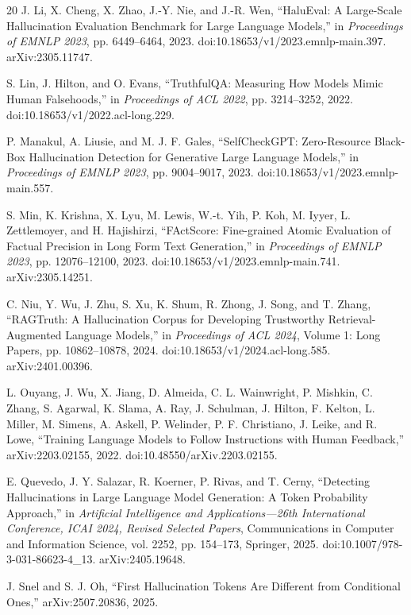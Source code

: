 \documentclass[11pt]{article}
\begin{document}
\begin{thebibliography}{20}
J. Li, X. Cheng, X. Zhao, J.-Y. Nie, and J.-R. Wen,
``HaluEval: A Large-Scale Hallucination Evaluation Benchmark for Large Language Models,''
in \textit{Proceedings of EMNLP 2023},
pp. 6449--6464, 2023.
doi:10.18653/v1/2023.emnlp-main.397.
arXiv:2305.11747.

S. Lin, J. Hilton, and O. Evans,
``TruthfulQA: Measuring How Models Mimic Human Falsehoods,''
in \textit{Proceedings of ACL 2022},
pp. 3214--3252, 2022.
doi:10.18653/v1/2022.acl-long.229.

P. Manakul, A. Liusie, and M. J. F. Gales,
``SelfCheckGPT: Zero-Resource Black-Box Hallucination Detection for Generative Large Language Models,''
in \textit{Proceedings of EMNLP 2023},
pp. 9004--9017, 2023.
doi:10.18653/v1/2023.emnlp-main.557.

S. Min, K. Krishna, X. Lyu, M. Lewis, W.-t. Yih, P. Koh, M. Iyyer,
L. Zettlemoyer, and H. Hajishirzi,
``FActScore: Fine-grained Atomic Evaluation of Factual Precision in Long Form Text Generation,''
in \textit{Proceedings of EMNLP 2023},
pp. 12076--12100, 2023.
doi:10.18653/v1/2023.emnlp-main.741.
arXiv:2305.14251.

C. Niu, Y. Wu, J. Zhu, S. Xu, K. Shum, R. Zhong, J. Song, and T. Zhang,
``RAGTruth: A Hallucination Corpus for Developing Trustworthy Retrieval-Augmented Language Models,''
in \textit{Proceedings of ACL 2024}, Volume 1: Long Papers,
pp. 10862--10878, 2024.
doi:10.18653/v1/2024.acl-long.585.
arXiv:2401.00396.

L. Ouyang, J. Wu, X. Jiang, D. Almeida, C. L. Wainwright, P. Mishkin,
C. Zhang, S. Agarwal, K. Slama, A. Ray, J. Schulman, J. Hilton,
F. Kelton, L. Miller, M. Simens, A. Askell, P. Welinder,
P. F. Christiano, J. Leike, and R. Lowe,
``Training Language Models to Follow Instructions with Human Feedback,''
arXiv:2203.02155, 2022.
doi:10.48550/arXiv.2203.02155.

E. Quevedo, J. Y. Salazar, R. Koerner, P. Rivas, and T. Cerny,
``Detecting Hallucinations in Large Language Model Generation:
A Token Probability Approach,''
in \textit{Artificial Intelligence and Applications---26th International Conference,
ICAI 2024, Revised Selected Papers},
Communications in Computer and Information Science, vol. 2252,
pp. 154--173, Springer, 2025.
doi:10.1007/978-3-031-86623-4\_13.
arXiv:2405.19648.

J. Snel and S. J. Oh,
``First Hallucination Tokens Are Different from Conditional Ones,''
arXiv:2507.20836, 2025.


\end{thebibliography}
\end{document}
